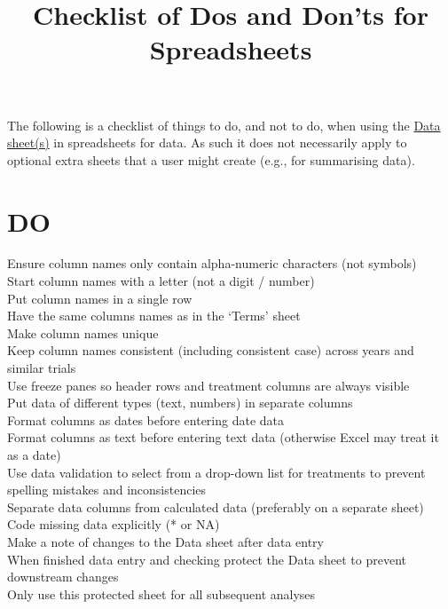 \documentclass[12pt]{article} %
\title{Checklist of Dos and Don'ts for Spreadsheets}
\makeatletter
\renewcommand{\maketitle}{%
  {\bfseries{\scshape{\Large{\@title\par}}}}
}
\makeatother
\begin{document}
  \maketitle

The following is a checklist of things to do, and not to do, when using the \href{https://github.com/PeterAlspach/Ecuador/blob/master/DataManagement/DataManagementUsingSpreadsheets.html}{Data sheet(s)} in spreadsheets for data.  As such it does not necessarily apply to optional extra sheets that a user might create (e.g., for summarising data).

\section{DO}
 Ensure column names only contain alpha-numeric characters (not symbols)\\
 Start column names with a letter (not a digit / number)\\
 Put column names in a single row\\
 Have the same columns names as in the `Terms' sheet\\
 Make column names unique\\
 Keep column names consistent (including consistent case) across years and similar trials\\
 Use freeze panes so header rows and treatment columns are always visible\\
 Put data of different types (text, numbers) in separate columns\\
 Format columns as dates before entering date data\\
 Format columns as text before entering text data (otherwise Excel may treat it as a date)\\
 Use data validation to select from a drop-down list for treatments to prevent spelling mistakes and inconsistencies\\
 Separate data columns from calculated data (preferably on a separate sheet)\\
 Code missing data explicitly (* or NA)\\
 Make a note of changes to the Data sheet after data entry\\
 When finished data entry and checking protect the Data sheet to prevent downstream changes\\
 Only use this protected sheet for all subsequent analyses\\
\end{document}

